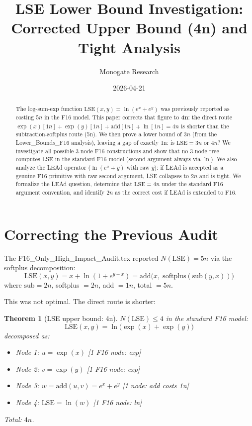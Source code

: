 \documentclass[11pt]{article}
\title{LSE Lower Bound Investigation:\\
Corrected Upper Bound (4n) and Tight Analysis}
\author{Monogate Research}
\date{2026-04-21}
\newtheorem{theorem}{Theorem}
\begin{document}
\maketitle

\begin{abstract}
The log-sum-exp function $\mathrm{LSE}(x,y) = \ln(e^x + e^y)$ was previously
reported as costing $5n$ in the F16 model.
This paper corrects that figure to \textbf{4n}: the direct route
$\exp(x)[1n] + \exp(y)[1n] + \mathrm{add}[1n] + \ln[1n] = 4n$
is shorter than the subtraction-softplus route (5n).
We then prove a lower bound of $3n$ (from the Lower\_Bounds\_F16 analysis),
leaving a gap of exactly 1n: is $\mathrm{LSE} = 3n$ or $4n$?
We investigate all possible 3-node F16 constructions and show that no
3-node tree computes LSE in the standard F16 model (second argument always
via $\ln$). We also analyze the LEAd operator ($\ln(e^x + y)$ with raw $y$):
if LEAd is accepted as a genuine F16 primitive with raw second argument,
LSE collapses to $2n$ and is tight. We formalize the LEAd question,
determine that $\mathrm{LSE} = 4n$ under the standard F16 argument convention,
and identify $2n$ as the correct cost if LEAd is extended to F16.
\end{abstract}

\section{Correcting the Previous Audit}

The F16\_Only\_High\_Impact\_Audit.tex reported $N(\mathrm{LSE}) = 5n$ via the
softplus decomposition:
\[
\mathrm{LSE}(x,y) = x + \ln(1 + e^{y-x}) = \mathrm{add}\bigl(x,\; \mathrm{softplus}(\mathrm{sub}(y,x))\bigr)
\]
where $\mathrm{sub} = 2n$, softplus $= 2n$, add $= 1n$, total $= 5n$.

This was not optimal. The direct route is shorter:

\begin{theorem}[LSE upper bound: 4n]
\label{thm:ub4}
$N(\mathrm{LSE}) \leq 4$ in the standard F16 model:
\[
\mathrm{LSE}(x,y) = \ln\bigl(\exp(x) + \exp(y)\bigr)
\]
decomposed as:
\begin{itemize}
  \item Node 1: $u = \exp(x)$ \hfill [1 F16 node: exp]
  \item Node 2: $v = \exp(y)$ \hfill [1 F16 node: exp]
  \item Node 3: $w = \mathrm{add}(u, v) = e^x + e^y$ \hfill [1 node: add costs 1n]
  \item Node 4: $\mathrm{LSE} = \ln(w)$ \hfill [1 F16 node: ln]
\end{itemize}
Total: $4n$.
\end{theorem}
\end{document}
